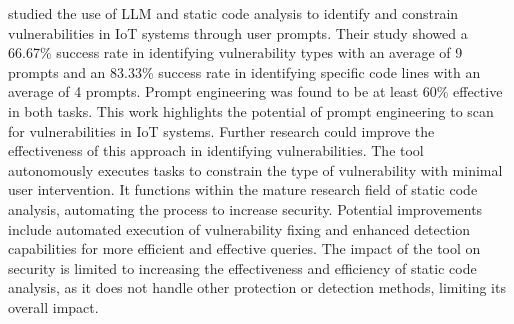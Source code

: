 \smallskip
\noindent \textbf{\citet{yang2023iot}} studied the use of LLM and static code analysis to identify and constrain vulnerabilities in IoT systems through user prompts.
Their study showed a 66.67\% success rate in identifying vulnerability types with an average of 9 prompts and an 83.33\% success rate in identifying specific code lines with an average of 4 prompts.
Prompt engineering was found to be at least 60\% effective in both tasks.
This work highlights the potential of prompt engineering to scan for vulnerabilities in IoT systems.
Further research could improve the effectiveness of this approach in identifying vulnerabilities.
The tool autonomously executes tasks to constrain the type of vulnerability with minimal user intervention.
It functions within the mature research field of static code analysis, automating the process to increase security.
Potential improvements include automated execution of vulnerability fixing and enhanced detection capabilities for more efficient and effective queries.
The impact of the tool on security is limited to increasing the effectiveness and efficiency of static code analysis, as it does not handle other protection or detection methods, limiting its overall impact.